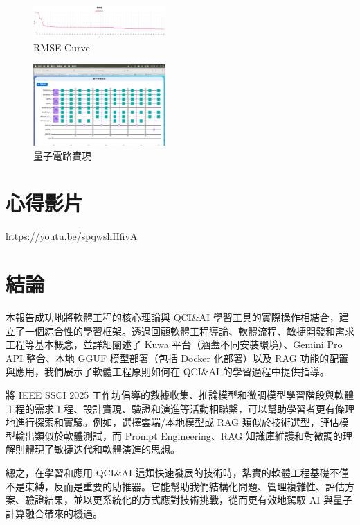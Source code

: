 \documentclass[twocolumn,11pt,a4paper]{article}
\begin{document}
\begin{figure}[htbp]
    \centering
    \includegraphics[width=0.45\textwidth]{res/image/rmse.png} %
    \caption{RMSE Curve} %
    \label{fig:rmse_curve} %
\end{figure}


\begin{figure}[htbp]
    \centering
    \includegraphics[width=0.45\textwidth]{res/image/quantum.png} %
    \caption{量子電路實現} %
    \label{fig:quantum_circuit} %
\end{figure}
\FloatBarrier %

\section{心得影片}
\href{https://youtu.be/spqwshHfivA}{https://youtu.be/spqwshHfivA}


\section{結論}
本報告成功地將軟體工程的核心理論與 QCI\&AI 學習工具的實際操作相結合，建立了一個綜合性的學習框架。透過回顧軟體工程導論、軟體流程、敏捷開發和需求工程等基本概念，並詳細闡述了 Kuwa 平台（涵蓋不同安裝環境）、Gemini Pro API 整合、本地 GGUF 模型部署（包括 Docker 化部署）以及 RAG 功能的配置與應用，我們展示了軟體工程原則如何在 QCI\&AI 的學習過程中提供指導。

將 IEEE SSCI 2025 工作坊倡導的數據收集、推論模型和微調模型學習階段與軟體工程的需求工程、設計實現、驗證和演進等活動相聯繫，可以幫助學習者更有條理地進行探索和實驗。例如，選擇雲端/本地模型或 RAG 類似於技術選型，評估模型輸出類似於軟體測試，而 Prompt Engineering、RAG 知識庫維護和對微調的理解則體現了敏捷迭代和軟體演進的思想。

總之，在學習和應用 QCI\&AI 這類快速發展的技術時，紮實的軟體工程基礎不僅不是束縛，反而是重要的助推器。它能幫助我們結構化問題、管理複雜性、評估方案、驗證結果，並以更系統化的方式應對技術挑戰，從而更有效地駕馭 AI 與量子計算融合帶來的機遇。
\end{document}
